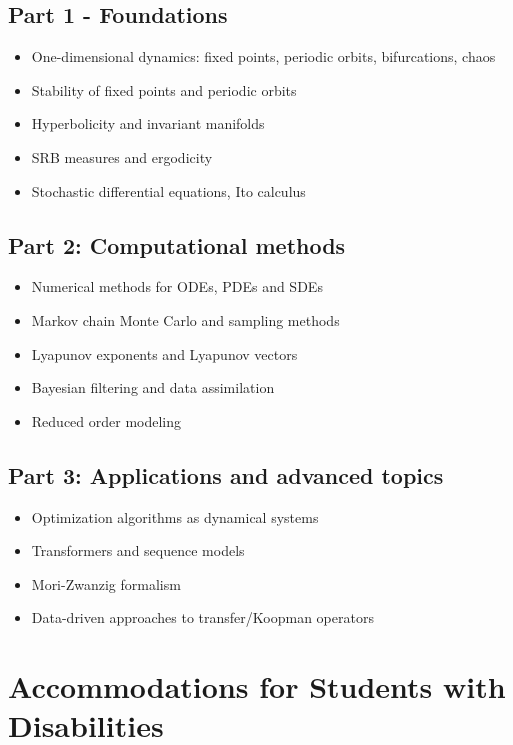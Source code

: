 \documentclass[12pt]{article}
\begin{document}
\subsection*{Part 1 - Foundations}

\begin{itemize}
	\item One-dimensional dynamics: fixed points, periodic orbits, bifurcations, chaos
	\item Stability of fixed points and periodic orbits
	\item Hyperbolicity and invariant manifolds
	\item SRB measures and ergodicity
	\item Stochastic differential equations, Ito calculus

\end{itemize}
\subsection*{Part 2: Computational methods}
\begin{itemize}
	\item Numerical methods for ODEs, PDEs and SDEs
	\item Markov chain Monte Carlo and sampling methods
	\item Lyapunov exponents and Lyapunov vectors
	\item Bayesian filtering and data assimilation
	\item Reduced order modeling
\end{itemize}

\subsection*{Part 3: Applications and advanced topics}
\begin{itemize}
	\item Optimization algorithms as dynamical systems
	\item Transformers and sequence models
	\item Mori-Zwanzig formalism
	\item Data-driven approaches to transfer/Koopman operators
\end{itemize}

\section{Accommodations for Students with Disabilities} 
\end{document}
